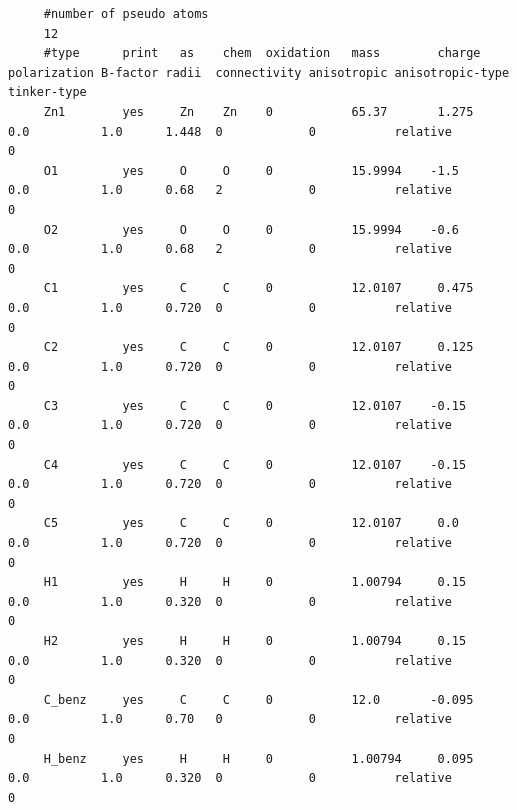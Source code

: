 \begin{tiny}
\begin{verbatim}
     #number of pseudo atoms
     12
     #type      print   as    chem  oxidation   mass        charge   polarization B-factor radii  connectivity anisotropic anisotropic-type   tinker-type
     Zn1        yes     Zn    Zn    0           65.37       1.275    0.0          1.0      1.448  0            0           relative           0
     O1         yes     O     O     0           15.9994    -1.5      0.0          1.0      0.68   2            0           relative           0
     O2         yes     O     O     0           15.9994    -0.6      0.0          1.0      0.68   2            0           relative           0
     C1         yes     C     C     0           12.0107     0.475    0.0          1.0      0.720  0            0           relative           0
     C2         yes     C     C     0           12.0107     0.125    0.0          1.0      0.720  0            0           relative           0
     C3         yes     C     C     0           12.0107    -0.15     0.0          1.0      0.720  0            0           relative           0
     C4         yes     C     C     0           12.0107    -0.15     0.0          1.0      0.720  0            0           relative           0
     C5         yes     C     C     0           12.0107     0.0      0.0          1.0      0.720  0            0           relative           0
     H1         yes     H     H     0           1.00794     0.15     0.0          1.0      0.320  0            0           relative           0
     H2         yes     H     H     0           1.00794     0.15     0.0          1.0      0.320  0            0           relative           0
     C_benz     yes     C     C     0           12.0       -0.095    0.0          1.0      0.70   0            0           relative           0
     H_benz     yes     H     H     0           1.00794     0.095    0.0          1.0      0.320  0            0           relative           0
\end{verbatim}
\end{tiny}

